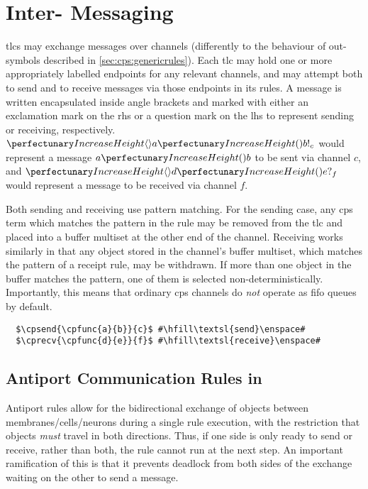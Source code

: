 \section{\label{sec:cps:intertlcmess}Inter- Messaging}

\Glspl{tlc} may exchange messages over channels (differently to the behaviour of out-symbols described in \cref{sec:cps:genericrules}).  Each \gls{tlc} may hold one or more appropriately labelled endpoints for any relevant channels, and may attempt both to send and to receive messages via those endpoints in its rules.  A message is written encapsulated inside angle brackets and marked with either an exclamation mark on the \gls{rhs} or a question mark on the \gls{lhs} to represent sending or receiving, respectively.  \Eg{} \(\cpsend{\cpfunc{a}{b}}{c}\) would represent a message \(\cpfunc{a}{b}\) to be sent via channel \(c\), and \(\cprecv{\cpfunc{d}{e}}{f}\) would represent a message to be received via channel \(f\).

Both sending and receiving use pattern matching.  For the sending case, any \gls{cps} term which matches the pattern in the rule may be removed from the \gls{tlc} and placed into a buffer multiset at the other end of the channel.  Receiving works similarly in that any object stored in the channel's buffer multiset, which matches the pattern of a receipt rule, may be withdrawn.  If more than one object in the buffer matches the pattern, one of them is selected non-deterministically.  Importantly, this means that ordinary \gls{cps} channels do \emph{not} operate as \gls{fifo} queues by default.

\lstset{xleftmargin=.5in, xrightmargin=.5in} 
\begin{lstlisting}
  $\cpsend{\cpfunc{a}{b}}{c}$ #\hfill\textsl{send}\enspace#
  $\cprecv{\cpfunc{d}{e}}{f}$ #\hfill\textsl{receive}\enspace#
\end{lstlisting}

\subsection{\label{sec:cps:antiport}Antiport Communication Rules in }

Antiport rules \cite{Orellana-Martin2019,Paun2002} allow for the bidirectional exchange of objects between membranes/cells/neurons during a single rule execution, with the restriction that objects \emph{must} travel in both directions.  Thus, if one side is only ready to send or receive, rather than both, the rule cannot run at the next step.  An important ramification of this is that it prevents deadlock from both sides of the exchange waiting on the other to send a message.

